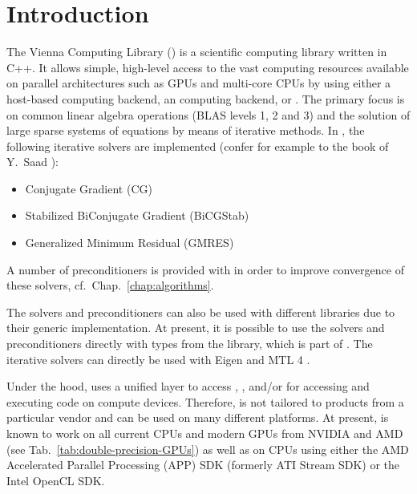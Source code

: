 
\chapter*{Introduction}   

The Vienna Computing Library (\ViennaCL) is a scientific computing
library written in C++. It allows simple, high-level access
to the vast computing resources available on parallel architectures such as
GPUs and multi-core CPUs by using either a host-based computing backend, an {\OpenCL} computing backend, or {\CUDA}.
The primary focus is on common linear algebra
operations (BLAS levels 1, 2 and 3) and the solution of large sparse systems of equations by means of iterative
methods. In {\ViennaCLminorversion}, the following iterative solvers are
implemented (confer for example to the book of Y.~Saad \cite{saad-iterative-solution}):
\begin{itemize}
 \item Conjugate Gradient (CG)
 \item Stabilized BiConjugate Gradient (BiCGStab)
 \item Generalized Minimum Residual (GMRES)
\end{itemize}
A number of preconditioners is provided with {\ViennaCLversion} in order to improve convergence of these solvers, cf.~Chap.~\ref{chap:algorithms}.

The solvers and preconditioners can also be used with different
libraries due to their generic implementation. At present, it is possible to
use the solvers and preconditioners directly with types from the {\ublas} library, which is part of 
{\Boost} \cite{boost}. The iterative solvers can directly be used with Eigen \cite{eigen} and MTL 4 \cite{mtl4}.

Under the hood, {\ViennaCL} uses a unified layer to access {\CUDA} \cite{nvidiacuda}, {\OpenCL} \cite{khronoscl}, and/or {\OpenMP} \cite{openmp} for accessing and
executing code on compute devices. Therefore, {\ViennaCL} is not tailored 
to products from a particular vendor and can be used on many different
platforms. At present, {\ViennaCL} is known to work on all current CPUs and modern GPUs from NVIDIA
and AMD (see Tab.~\ref{tab:double-precision-GPUs}) as well as on CPUs 
using either the AMD Accelerated Parallel Processing (APP) SDK (formerly ATI Stream SDK) or the Intel OpenCL SDK.


